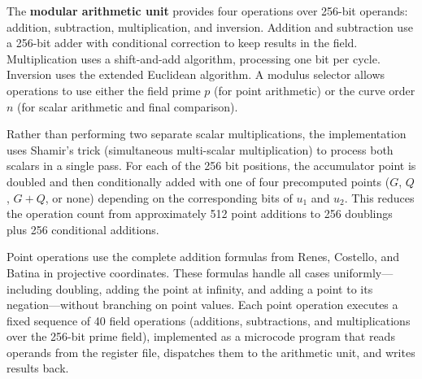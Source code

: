 \documentclass{article}
\begin{document}
\begin{appendices}
The \textbf{modular arithmetic unit} provides four operations over 256-bit operands: addition, subtraction, multiplication, and inversion. Addition and subtraction use a 256-bit adder with conditional correction to keep results in the field. Multiplication uses a shift-and-add algorithm, processing one bit per cycle. Inversion uses the extended Euclidean algorithm. A modulus selector allows operations to use either the field prime $p$ (for point arithmetic) or the curve order $n$ (for scalar arithmetic and final comparison).

Rather than performing two separate scalar multiplications, the implementation uses Shamir's trick (simultaneous multi-scalar multiplication) to process both scalars in a single pass. For each of the 256 bit positions, the accumulator point is doubled and then conditionally added with one of four precomputed points ($G$, $Q$, $G+Q$, or none) depending on the corresponding bits of $u_1$ and $u_2$. This reduces the operation count from approximately 512 point additions to 256 doublings plus 256 conditional additions.

Point operations use the complete addition formulas from Renes, Costello, and Batina \cite{renes_complete_2016} in projective coordinates. These formulas handle all cases uniformly---including doubling, adding the point at infinity, and adding a point to its negation---without branching on point values. Each point operation executes a fixed sequence of 40 field operations (additions, subtractions, and multiplications over the 256-bit prime field), implemented as a microcode program that reads operands from the register file, dispatches them to the arithmetic unit, and writes results back.

\end{appendices}
\end{document}
